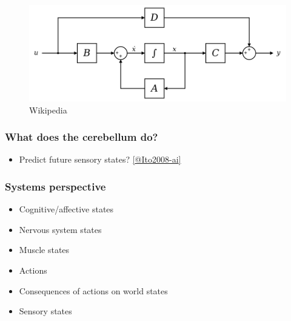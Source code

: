 \documentclass[
  letterpaper,
  DIV=11,
  numbers=noendperiod]{scrartcl}
\providecommand{\tightlist}{%
  \setlength{\itemsep}{0pt}\setlength{\parskip}{0pt}}\usepackage{longtable,booktabs,array}
\begin{document}
\begin{figure}[H]

{\centering \includegraphics{action_files/mediabag/944px-Typical_State_.png}

}

\caption{Wikipedia}

\end{figure}%

\subsubsection{What does the cerebellum
do?}\label{what-does-the-cerebellum-do}

\begin{itemize}
\tightlist
\item
  Predict future sensory states?
  \href{http://doi.org/10.1038/nrn2332}{{[}@Ito2008-ai{]}}
\end{itemize}

\subsubsection{Systems perspective}\label{systems-perspective}

\begin{itemize}
\tightlist
\item
  Cognitive/affective states
\item
  Nervous system states
\item
  Muscle states
\item
  Actions
\item
  Consequences of actions on world states
\item
  Sensory states
\end{itemize}
\end{document}
